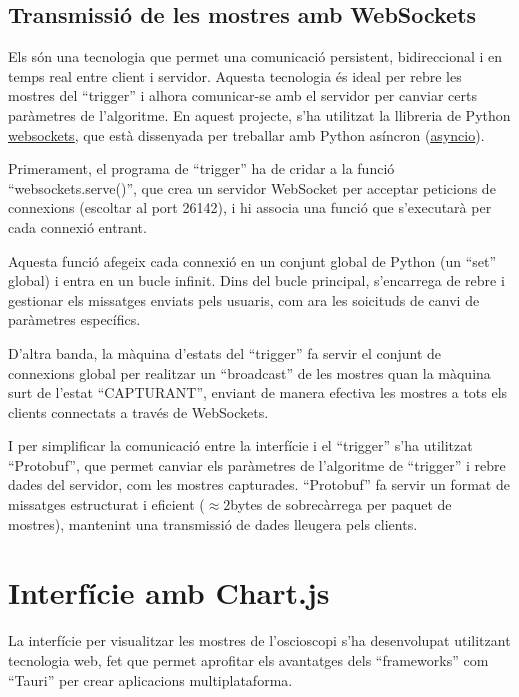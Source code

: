 \documentclass{tfgitic}[2023/06/30]
\begin{document}
\subsection{Transmissió de les mostres amb WebSockets}

Els \cite[WebSockets]{websockets} són una tecnologia que permet una
comunicació persistent, bidireccional i en temps real entre client i
servidor. Aquesta tecnologia és ideal per rebre les mostres del
``trigger'' i alhora comunicar-se amb el servidor per canviar certs
paràmetres de l'algoritme. En aquest projecte, s'ha utilitzat la
llibreria de Python
\href{https://pypi.org/project/websockets/}{\underline{websockets}},
que està dissenyada per treballar amb Python asíncron
(\href{https://docs.python.org/3/library/asyncio.html}{\underline{asyncio}}).

Primerament, el programa de ``trigger'' ha de cridar a la funció
``websockets.serve()'', que crea un servidor WebSocket per acceptar
peticions de connexions (escoltar al port 26142), i hi associa una
funció que s'executarà per cada connexió entrant.

Aquesta funció afegeix cada connexió en un conjunt global de Python
(un ``set'' global) i entra en un bucle infinit. Dins del bucle
principal, s'encarrega de rebre i gestionar els missatges enviats pels
usuaris, com ara les so\lgem icituds de canvi de paràmetres
específics.

D'altra banda, la màquina d'estats del ``trigger'' fa servir el
conjunt de connexions global per realitzar un ``broadcast'' de les
mostres quan la màquina surt de l'estat ``CAPTURANT'', enviant de
manera efectiva les mostres a tots els clients connectats a través de
WebSockets.

I per simplificar la comunicació entre la interfície i el ``trigger''
s'ha utilitzat ``Protobuf'', que permet canviar els paràmetres de
l'algoritme de ``trigger'' i rebre dades del servidor, com les mostres
capturades. ``Protobuf'' fa servir un format de missatges estructurat
i eficient ($\approx 2$bytes de sobrecàrrega per paquet de mostres),
mantenint una transmissió de dades lleugera pels clients.

\section{Interfície amb Chart.js}

La interfície per visualitzar les mostres de l'osci\lgem oscopi s'ha
desenvolupat utilitzant tecnologia web, fet que permet aprofitar els
avantatges dels ``frameworks'' com ``Tauri'' per crear aplicacions
multiplataforma.
\end{document}
